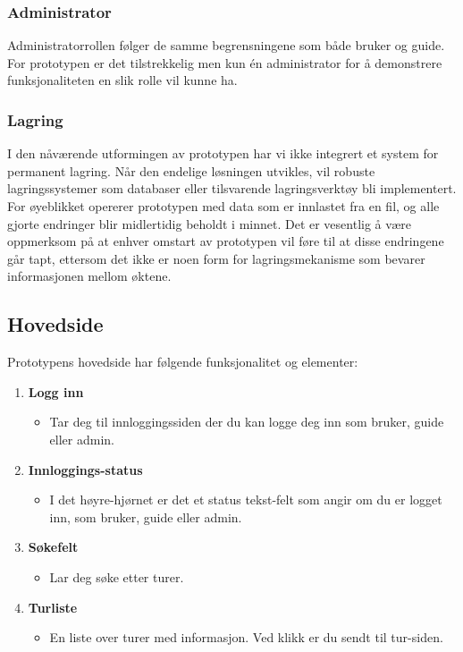 \documentclass[../doc]{subfiles}
\begin{document}
\subsubsection*{Administrator}
Administratorrollen følger de samme begrensningene som både bruker og guide. For prototypen er det tilstrekkelig men kun én administrator for å demonstrere funksjonaliteten en slik rolle vil kunne ha.

\subsubsection*{Lagring}
I den nåværende utformingen av prototypen har vi ikke integrert et system for permanent lagring. Når den endelige løsningen utvikles, vil robuste lagringssystemer som databaser eller tilsvarende lagringsverktøy bli implementert. For øyeblikket opererer prototypen med data som er innlastet fra en fil, og alle gjorte endringer blir midlertidig beholdt i minnet. Det er vesentlig å være oppmerksom på at enhver omstart av prototypen vil føre til at disse endringene går tapt, ettersom det ikke er noen form for lagringsmekanisme som bevarer informasjonen mellom øktene.

\subsection{Hovedside}
Prototypens hovedside har følgende funksjonalitet og elementer:

\begin{enumerate}
    \item \textbf{Logg inn}
    \begin{itemize}
        \item Tar deg til innloggingssiden der du kan logge deg inn som bruker, guide eller admin.
    \end{itemize}

    \item \textbf{Innloggings-status}
    \begin{itemize}
        \item I det høyre-hjørnet er det et status tekst-felt som angir om du er logget inn, som bruker, guide eller admin.
    \end{itemize}

    \item \textbf{Søkefelt}
    \begin{itemize}
        \item Lar deg søke etter turer.
    \end{itemize}

    \item \textbf{Turliste}
    \begin{itemize}
        \item En liste over turer med informasjon. Ved klikk er du sendt til tur-siden.
    \end{itemize}
\end{enumerate}
\end{document}
